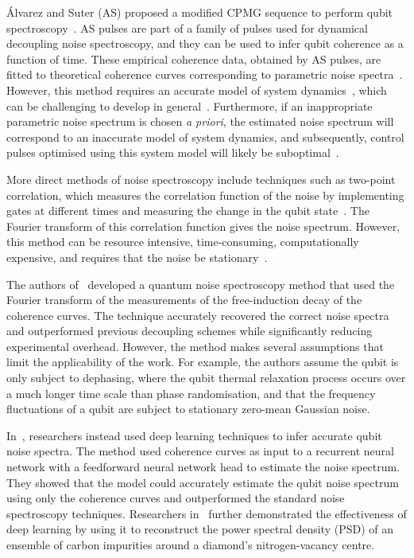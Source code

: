 \documentclass[12pt]{iopart}
\begin{document}
\'Alvarez and Suter (AS) proposed a modified CPMG sequence to perform qubit spectroscopy~\cite{alvarez2011measuring}. AS pulses are part of a family of pulses used for dynamical decoupling noise spectroscopy, and they can be used to infer qubit coherence as a function of time. These empirical coherence data, obtained by AS pulses, are fitted to theoretical coherence curves corresponding to parametric noise spectra~\cite{von2020two, sun2022self}. However, this method requires an accurate model of system dynamics~\cite{wise2021using}, which can be challenging to develop in general~\cite{martina2023machine}. Furthermore, if an inappropriate parametric noise spectrum is chosen \textit{a priori}, the estimated noise spectrum will correspond to an inaccurate model of system dynamics, and subsequently, control pulses optimised using this system model will likely be suboptimal~\cite{martina2023machine}.

More direct methods of noise spectroscopy include techniques such as two-point correlation, which measures the correlation function of the noise by implementing gates at different times and measuring the change in the qubit state~\cite{baroni2022nuclear}. The Fourier transform of this correlation function gives the noise spectrum. However, this method can be resource intensive, time-consuming, computationally expensive, and requires that the noise be stationary~\cite{von2020two,wise2021using,martina2023deep,vezvaee2024fourier}.

The authors of~\cite{vezvaee2024fourier} developed a quantum noise spectroscopy method that used the Fourier transform of the measurements of the free-induction decay of the coherence curves. The technique accurately recovered the correct noise spectra and outperformed previous decoupling schemes while significantly reducing experimental overhead. However, the method makes several assumptions that limit the applicability of the work. For example, the authors assume the qubit is only subject to dephasing, where the qubit thermal relaxation process occurs over a much longer time scale than phase randomisation, and that the frequency fluctuations of a qubit are subject to stationary zero-mean Gaussian noise.

In~\cite{wise2021using}, researchers instead used deep learning techniques to infer accurate qubit noise spectra. The method used coherence curves as input to a recurrent neural network with a feedforward neural network head to estimate the noise spectrum. They showed that the model could accurately estimate the qubit noise spectrum using only the coherence curves and outperformed the standard noise spectroscopy techniques. Researchers in~\cite{martina2023deep} further demonstrated the effectiveness of deep learning by using it to reconstruct the power spectral density (PSD) of an ensemble of carbon impurities around a diamond's nitrogen-vacancy centre.
\end{document}
